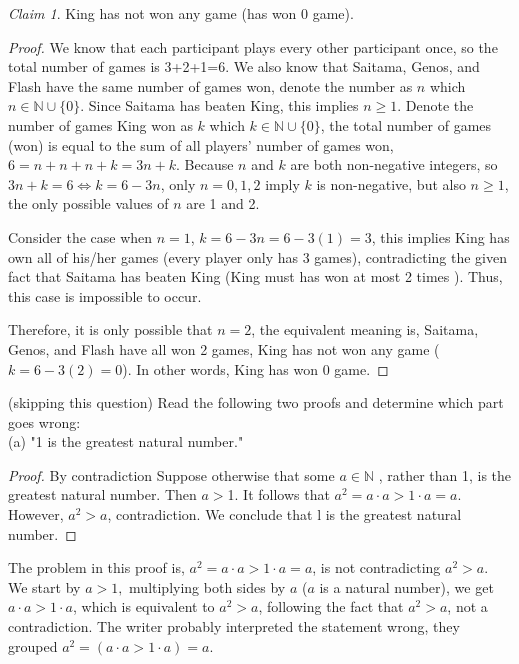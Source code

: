 \documentclass{homework}
\theoremstyle{remark}
\newtheorem*{claim}{Claim}
\newcommand{\?}{\stackrel{?}{=}}
\begin{document}
\begin{claim}
    King has not won any game (has won 0 game). 
\end{claim}

\begin{proof}
    We know that each participant plays every other participant once, so the total number of games is 3+2+1=6. We also know that Saitama, Genos, and Flash have the same number of games won, denote the number as $n$ which $n\in\mathbb{N}\cup\{0\}$. Since Saitama has beaten King, this implies $n\geq1$. Denote the number of games King won as $k$ which $k\in\mathbb{N}\cup\{0\}$, the total number of games (won) is equal to the sum of all players' number of games won, $6=n+n+n+k=3n+k$. Because $n$ and $k$ are both non-negative integers, so $3n+k=6 \iff k=6-3n$, only $n=0,1,2$ imply $k$ is non-negative, but also $n\geq1$, the only possible values of $n$ are 1 and 2. 

    Consider the case when $n = 1$, $k=6-3n=6-3(1)=3$, this implies King has own all of his/her games (every player only has 3 games), contradicting the given fact that Saitama has beaten King (King must has won at most 2 times ). Thus, this case is impossible to occur.

    Therefore, it is only possible that $n = 2$, the equivalent meaning is, Saitama, Genos, and Flash have all won 2 games, King has not won any game ($k=6-3(2)=0$).  In other words, King has won 0 game.
\end{proof}

\newpage
\question (skipping this question) Read the following two proofs and determine which part goes wrong:\\

(a) "1 is the greatest natural number."

\begin{proof}
    By contradiction Suppose otherwise that some $a\in\mathbb{N}$ , rather than 1, is the greatest natural number. Then $a> $1. It follows that $a^2=a\cdot a>1\cdot a=a$. However, $a^2>a$, contradiction. We conclude that l is the greatest natural number.
\end{proof}
The problem in this proof is, $a^2=a\cdot a > 1\cdot a = a$, is not contradicting $a^2>a$. We start by $a>1,$ multiplying both sides by $a$ ($a$ is a natural number), we get $a\cdot a>1\cdot a$, which is equivalent to $a^2>a$, following the fact that $a^2>a$, not a contradiction. The writer probably interpreted the statement wrong, they grouped $a^2=(a\cdot a > 1\cdot a) = a$. 
\end{document}
